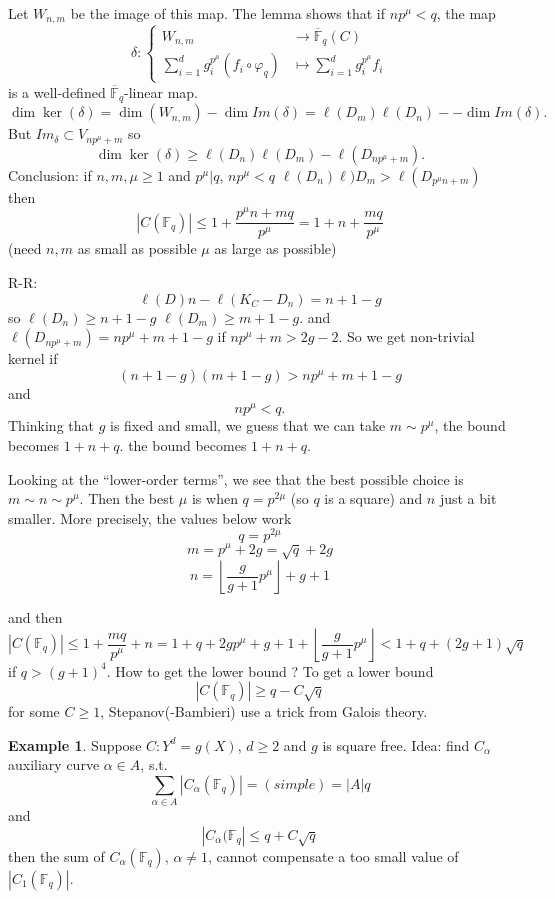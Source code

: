 \documentclass[11pt]{article}
\theoremstyle{definition}
\newtheorem{ex}[thm]{Example}
\newcommand{\bbf}{\mathbb F}
\newcommand{\lrta}{\longrightarrow}
\begin{document}
Let $W_{n,m}$ be the image  of this map. The lemma shows that if $n p^\mu<q$, the map 
$$
\delta:\left\{
\begin{aligned}
W_{n,m}&\lrta \overline{\bbf}_q(C)\\
\sum_{i=1}^d
g_i^{p^\mu}(f_i\circ \varphi_q)&
\longmapsto \sum_{i=1}^d g_i^{p^\mu}f_i
\end{aligned}\right.
$$
is a well-defined $\overline{\bbf}_q$-linear map. 
$$
\dim \ker(\delta)=\dim(W_{n,m})-\dim Im(\delta)=\ell(D_m)\ell(D_n)--\dim Im(\delta).
$$
But $Im_{\delta}\subset V_{np^\mu+m}$ so 
$$
\dim \ker(\delta)\geq \ell(D_n)\ell(D_m)-\ell(D_{np^\mu+m}).
$$
Conclusion:
if $n,m,\mu\geq 1$ and 
$p^\mu|q$, $np^\mu<q$ $\ell(D_n)\ell)D_m> \ell(D_{p^\mu n+m})$ then 
$$
|C(\bbf_q)|\leq 1+\frac{p^\mu n+ m q}{p^{\mu}}=1+n+\frac{mq}{p^\mu}
$$
(need $n,m$ as small as possible $\mu$ as large as possible)

R-R:
$$
\ell(D)n
-\ell(K_C-D_n)=n+1-g
$$
so $\ell(D_n)\geq n+1 -g$ $\ell(D_m)\geq m+1 -g$. and $\ell(D_{n p^\mu +m})=np^\mu+m+1-g$ if $np^\mu +m> 2g-2$. So we  get  non-trivial kernel if 
$$
(n+1-g)(m+1-g)> np^\mu+m+1-g
$$
and 
$$
np^\mu < q.
$$
Thinking that $g$ is fixed and small, we guess that we can take $m\sim p^\mu$, the bound becomes $1+n+q$. the bound becomes $1+n+q$. 

Looking at the ``lower-order terms'', we see that the best possible choice is $m\sim n\sim p^\mu$. Then the best $\mu$ is when  $q=p^{2\mu}$ (so $q$ is a square) and $n$ just  a bit smaller. More precisely, the values below work
$$
q=p^{2\mu}
$$
$$
m=p^\mu+2g=\sqrt{q}+2g
$$
$$
n=\left\lfloor \frac{g}{g+1}p^\mu\right\rfloor +g+1
$$

and then
$$
|C(\bbf_q)|\leq 1+\frac{m q}{p^\mu}+n =1+q+2g p^\mu +g+1+ \left\lfloor \frac{g}{g+1}p^\mu\right\rfloor< 1+q+(2g+1)\sqrt{q}
$$
if $q > (g+1)^4$.  How to get the lower bound ? To get a lower bound 
$$
|C(\bbf_q)|\geq q- C\sqrt{q}
$$
for some $C\geq 1$, Stepanov(-Bambieri) use a trick from Galois theory.

\begin{ex}
Suppose $C:Y^d=g(X)$, $d\geq 2$ and $g$  is square free. 
Idea: find $C_\alpha$ auxiliary curve $\alpha\in A$, s.t. 
$$
\sum_{\alpha\in A}|C_\alpha(\bbf_q)|=(simple)=|A|q
$$
and 
$$
|C_\alpha(\bbf_q|\leq q+ C\sqrt{q}
$$
then the sum of $C_\alpha(\bbf_q)$, $\alpha\neq 1$, cannot compensate a too small value of $|C_1(\bbf_q)|$.
\end{ex}
\end{document}
